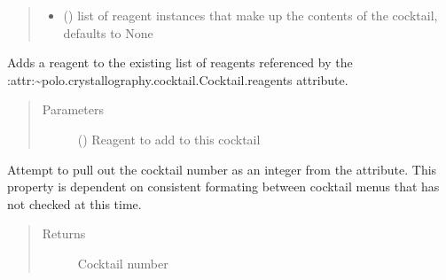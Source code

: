 \documentclass[letterpaper,10pt,english]{sphinxmanual}
\begin{document}
\begin{fulllineitems}
\begin{quote}
\begin{description}
\begin{itemize}
\item {} 
 ({\hyperref[\detokenize{polo.crystallography:polo.crystallography.cocktail.Reagent}]{}}\sphinxstyleliteralemphasis{\sphinxupquote{, }}) \textendash{} list of reagent instances that make up the contents
of the cocktail, defaults to None

\end{itemize}

\end{description}\end{quote}

\begin{fulllineitems}
\label{\detokenize{polo.crystallography:polo.crystallography.cocktail.Cocktail.add_reagent}}
Adds a reagent to the existing list of reagents referenced by the
:attr:{\color{red}\bfseries{}\textasciigrave{}}\textasciitilde{}polo.crystallography.cocktail.Cocktail.reagents attribute.
\begin{quote}\begin{description}
\item[{Parameters}] \leavevmode
{} ({\hyperref[\detokenize{polo.crystallography:polo.crystallography.cocktail.Reagent}]{}}) \textendash{} Reagent to add to this cocktail

\end{description}\end{quote}

\end{fulllineitems}


\begin{fulllineitems}
\label{\detokenize{polo.crystallography:polo.crystallography.cocktail.Cocktail.cocktail_index}}
Attempt to pull out the cocktail number as an integer
from the  attribute.
This property is dependent on consistent formating 
between cocktail menus that has not checked at this time.
\begin{quote}\begin{description}
\item[{Returns}] \leavevmode
Cocktail number


\end{description}
\end{quote}
\end{fulllineitems}
\end{fulllineitems}
\end{document}
